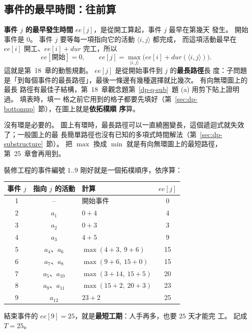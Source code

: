 \subsection{事件的最早時間：往前算}

\textbf{事件 $j$ 的最早發生時間} $\mathit{ee}[j]$，是從開工算起，事件 $j$ 最早在第幾天
發生。 開始事件是 $0$。 事件 $j$ 要等每一項指向它的活動 $\langle i, j \rangle$ 都完成，
而這項活動最早在 $\mathit{ee}[i]$ 開工、$\mathit{ee}[i] + \mathit{dur}$ 完工，所以
\[
\mathit{ee}[\text{開始}] = 0, \qquad
\mathit{ee}[j] = \max_{\langle i, j \rangle} \bigl( \mathit{ee}[i] + \mathit{dur}(\langle i, j \rangle) \bigr).
\]
這就是第~18~章的動態規劃。 $\mathit{ee}[j]$ 是從開始事件到 $j$ 的\textbf{最長路徑}長
度：子問題是「到每個事件的最長路徑」，最後一條邊有幾種選擇就比幾次。 有向無環圖上的最長
路徑有最佳子結構，第~18~章觀念題第~\ref{dp-q-sub}~題 (a) 用剪下貼上證明過。 填表時，填一
格之前它用到的格子都要先填好（第~\ref{sec:dp-bottomup}~節），在圖上就是\textbf{依拓樸順
序}算。

沒有環是必要的。 圖上有環時，最長路徑可以一直繞圈變長，這個遞迴式就失效了；一般圖上的最
長簡單路徑也沒有已知的多項式時間解法（第~\ref{sec:dp-substructure}~節）。 把 $\max$ 換成
$\min$ 就是有向無環圖上的最短路徑，第~25~章會再用到。

裝修工程的事件編號 $1..9$ 剛好就是一個拓樸順序，依序算：

\begin{center}
\small
\begin{tabular}{cclc}
\toprule
事件 $j$ & 指向 $j$ 的活動 & 計算 & $\mathit{ee}[j]$ \\
\midrule
1 & -- & 開始事件 & 0 \\
2 & $a_1$ & $0 + 4$ & 4 \\
3 & $a_2$ & $0 + 3$ & 3 \\
4 & $a_3$ & $4 + 5$ & 9 \\
5 & $a_4$、$a_6$ & $\max(4 + 3,\ 9 + 6)$ & 15 \\
6 & $a_7$、$a_8$ & $\max(9 + 6,\ 15 + 0)$ & 15 \\
7 & $a_5$、$a_{10}$ & $\max(3 + 14,\ 15 + 5)$ & 20 \\
8 & $a_9$、$a_{11}$ & $\max(15 + 2,\ 20 + 3)$ & 23 \\
9 & $a_{12}$ & $23 + 2$ & 25 \\
\bottomrule
\end{tabular}
\end{center}

結束事件的 $\mathit{ee}[9] = 25$，就是\textbf{最短工期}：人手再多，也要 $25$ 天才能完
工。 記成 $T = 25$。


